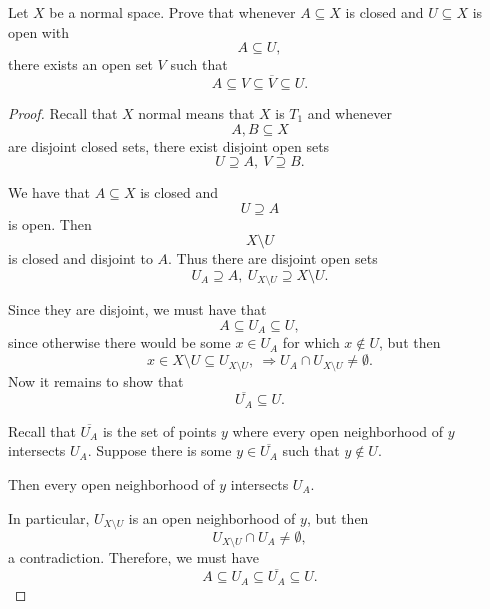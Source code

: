 \documentclass[11pt]{article}
\begin{document}
\begin{prob}
    Let $X$ be a normal space. Prove that 
    whenever $A \subseteq X$ is closed and 
    $U \subseteq X$ is open with 
    \[
        A \subseteq U, 
    \]
    there exists an open set $V$ such that 
    \[
        A \subseteq V \subseteq \overline V \subseteq U. 
    \]
\end{prob}
\begin{proof}
    Recall that $X$ normal means that 
    $X$ is $T_1$ and whenever 
    \[
        A, B \subseteq X 
    \]
    are disjoint closed sets, there exist 
    disjoint open sets 
    \[
        U \supseteq A, \ V \supseteq B. 
    \]

    We have that $A \subseteq X$ is closed 
    and 
    \[
        U \supseteq A 
    \]
    is open. 
    Then 
    \[
        X \setminus U 
    \]
    is closed and disjoint to $A$. Thus 
    there are disjoint open sets 
    \[
        U_A \supseteq A, \ U_{X\setminus U} 
        \supseteq X\setminus U. 
    \]

    Since they are disjoint, we must have that 
    \[
        A \subseteq U_A \subseteq U,  
    \]
    since otherwise there would be some 
    $x \in U_A$ for which $x \not\in U$, but then 
    \[
        x \in X \setminus U \subseteq U_{X\setminus U}, 
        \ \Rightarrow U_A \cap U_{X\setminus U} 
        \neq \emptyset. 
    \]
    Now it remains to show that 
    \[
        \overline{U_A} \subseteq U. 
    \]

    Recall that $\overline{U_A}$ is the set 
    of points $y$ where every open neighborhood of 
    $y$ intersects $U_A$. 
    Suppose there is some $y \in \overline{U_A}$ such that 
    $y \not\in U$. 
    
    Then every open neighborhood of $y$ intersects 
    $U_A$. 

    In particular, $U_{X \setminus U}$ is 
    an open neighborhood of $y$, but then 
    \[
        U_{X \setminus U} \cap U_A \neq \emptyset, 
    \] 
    a contradiction. 
    Therefore, we must have 
    \[
        A \subseteq U_A \subseteq \overline{U_A} 
        \subseteq U. 
    \]
\end{proof}
\end{document}
